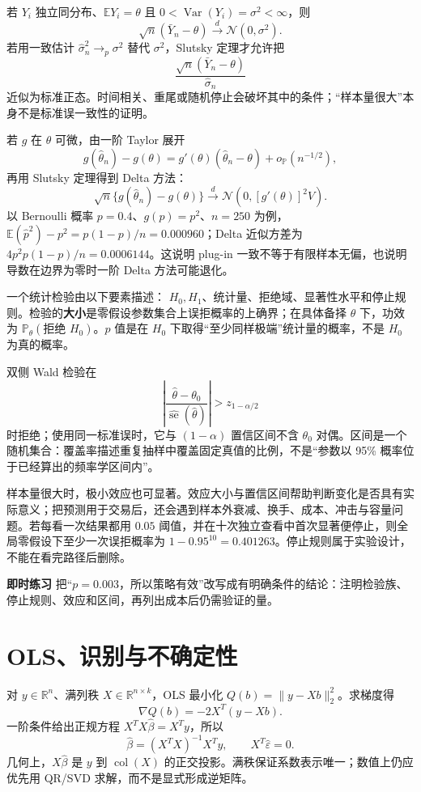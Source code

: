 \begin{proposition}[渐近正态的使用边界]
若 $Y_i$ 独立同分布、$\mathbb E Y_i=\theta$ 且
$0<\operatorname{Var}(Y_i)=\sigma^2<\infty$，则
\[
 \sqrt n(\bar Y_n-\theta)\xrightarrow d\mathcal N(0,\sigma^2).
\]
若用一致估计 $\widehat\sigma_n^2\to_p\sigma^2$ 替代 $\sigma^2$，Slutsky 定理才允许把
\[
 \frac{\sqrt n(\bar Y_n-\theta)}{\widehat\sigma_n}
\]
近似为标准正态。时间相关、重尾或随机停止会破坏其中的条件；“样本量很大”本身不是标准误一致性的证明。
\end{proposition}

若 $g$ 在 $\theta$ 可微，由一阶 Taylor 展开
\[
 g(\hat\theta_n)-g(\theta)
 =g'(\theta)(\hat\theta_n-\theta)+o_{\mathbb P}(n^{-1/2}),
\]
再用 Slutsky 定理得到 Delta 方法：
\[
 \sqrt n\{g(\hat\theta_n)-g(\theta)\}
 \xrightarrow d\mathcal N\!\left(0,[g'(\theta)]^2V\right).
\]
以 Bernoulli 概率 $p=0.4$、$g(p)=p^2$、$n=250$ 为例，
$\mathbb E(\hat p^2)-p^2=p(1-p)/n=0.000960$；Delta 近似方差为
$4p^2p(1-p)/n=0.0006144$。这说明 plug-in 一致不等于有限样本无偏，也说明导数在边界为零时一阶 Delta 方法可能退化。


一个统计检验由以下要素描述： $H_0,H_1$、统计量、拒绝域、显著性水平和停止规则。检验的\textbf{大小}是零假设参数集合上误拒概率的上确界；在具体备择 $\theta$ 下，功效为
$\mathbb P_\theta(\text{拒绝 }H_0)$。$p$ 值是在 $H_0$ 下取得“至少同样极端”统计量的概率，不是 $H_0$ 为真的概率。

双侧 Wald 检验在
\[
 \left|\frac{\hat\theta-\theta_0}{\widehat{\operatorname{se}}(\hat\theta)}\right|
 >z_{1-\alpha/2}
\]
时拒绝；使用同一标准误时，它与 $(1-\alpha)$ 置信区间不含
$\theta_0$ 对偶。区间是一个随机集合：覆盖率描述重复抽样中覆盖固定真值的比例，不是“参数以 95\% 概率位于已经算出的频率学区间内”。

样本量很大时，极小效应也可显著。效应大小与置信区间帮助判断变化是否具有实际意义；把预测用于交易后，还会遇到样本外衰减、换手、成本、冲击与容量问题。若每看一次结果都用 $0.05$ 阈值，并在十次独立查看中首次显著便停止，则全局零假设下至少一次误拒概率为
$1-0.95^{10}=0.401263$。停止规则属于实验设计，不能在看完路径后删除。

\noindent\textbf{即时练习}\quad
把“$p=0.003$，所以策略有效”改写成有明确条件的结论：注明检验族、停止规则、效应和区间，再列出成本后仍需验证的量。

\section{OLS、识别与不确定性}

对 $y\in\mathbb R^n$、满列秩 $X\in\mathbb R^{n\times k}$，OLS 最小化
$Q(b)=\lVert y-Xb\rVert_2^2$。求梯度得
\[
 \nabla Q(b)=-2X^T(y-Xb).
\]
一阶条件给出正规方程 $X^TX\hat\beta=X^Ty$，所以
\[
 \hat\beta=(X^TX)^{-1}X^Ty,
 \qquad X^T\hat\varepsilon=0.
\]
几何上，$X\hat\beta$ 是 $y$ 到 $\operatorname{col}(X)$ 的正交投影。满秩保证系数表示唯一；数值上仍应优先用 QR/SVD 求解，而不是显式形成逆矩阵。


